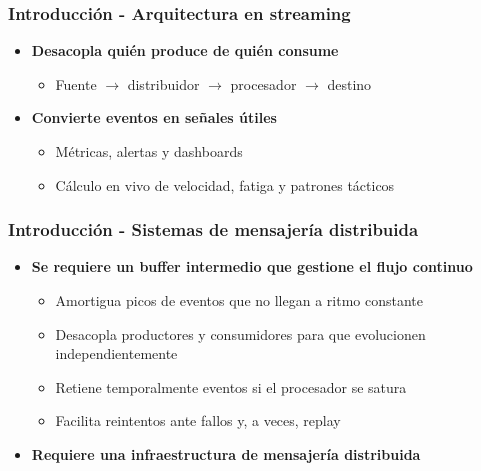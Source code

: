 \documentclass[aspectratio=169]{beamer}
\begin{document}
\begin{frame}
\frametitle{Introducción - Arquitectura en streaming}
	\begin{itemize}
		\item \textbf{Desacopla quién produce de quién consume}
		\begin{itemize}
			\item Fuente $\rightarrow$ distribuidor $\rightarrow$ procesador $\rightarrow$ destino
		\end{itemize}

		\vspace{1em}

		\item \textbf{Convierte eventos en señales útiles}
		\begin{itemize}
			\item Métricas, alertas y dashboards
			\item Cálculo en vivo de velocidad, fatiga y patrones tácticos
		\end{itemize}
	\end{itemize}
\end{frame}


\begin{frame}
\frametitle{Introducción - Sistemas de mensajería distribuida}
	\begin{itemize}
		\item \textbf{Se requiere un buffer intermedio que gestione el flujo continuo}
		\begin{itemize}
			\item Amortigua picos de eventos que no llegan a ritmo constante
			\item Desacopla productores y consumidores para que evolucionen independientemente
			\item Retiene temporalmente eventos si el procesador se satura
			\item Facilita reintentos ante fallos y, a veces, replay
		\end{itemize}

		\vspace{1em}

    \item \textbf{Requiere una infraestructura de mensajería distribuida}
	\end{itemize}
\end{frame}
\end{document}
